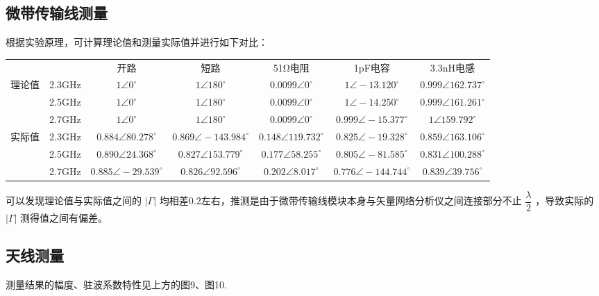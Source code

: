 \documentclass{source/Report}
\begin{document}
\subsection{微带传输线测量}
根据实验原理，可计算理论值和测量实际值并进行如下对比：\par
\begin{table}[h]
    \centering
    \begin{tabular}{|c|c|c|c|c|c|c|}
    \hline
    \multicolumn{2}{|c|}{\multirow{2}{*}{}} &\multirow{2}{*}{开路}&\multirow{2}{*}{短路} & \multirow{2}{*}{51Ω电阻}&\multirow{2}{*}{1pF电容} & \multirow{2}{*}{3.3nH电感}\\
    \multicolumn{2}{|c|}{\multirow{2}{*}{}} & & & & & \\
    \hline
    \multirow{3}{*}{理论值} & 2.3GHz & $1\angle 0^{\circ}$ & $1\angle 180^{\circ}$ & $0.0099\angle 0^{\circ}$ & $1\angle -13.120^{\circ}$ & $0.999\angle 162.737^{\circ}$ \\
    \cline{2-7}
    \multirow{3}{*}{}  & 2.5GHz & $1\angle 0^{\circ}$ & $1\angle 180^{\circ}$ & $0.0099\angle 0^{\circ}$ & $1\angle -14.250^{\circ}$ & $0.999\angle 161.261^{\circ}$ \\
    \cline{2-7}
    \multirow{3}{*}{} & 2.7GHz & $1\angle 0^{\circ}$ & $1\angle 180^{\circ}$ & $0.0099\angle 0^{\circ}$ & $0.999\angle -15.377^{\circ}$ & $1\angle 159.792^{\circ}$ \\
    \hline
    \multirow{3}{*}{实际值} & 2.3GHz & $0.884\angle 80.278^{\circ}$ & $0.869\angle -143.984^{\circ}$ & $0.148\angle 119.732^{\circ}$ & $0.825\angle -19.328^{\circ}$ & $0.859\angle 163.106^{\circ}$ \\
    \cline{2-7}
    \multirow{3}{*}{}  & 2.5GHz & $0.890\angle 24.368^{\circ}$ & $0.827\angle 153.779^{\circ}$ & $0.177\angle 58.255^{\circ}$ & $0.805\angle -81.585^{\circ}$ & $0.831\angle 100.288^{\circ}$ \\
    \cline{2-7}
    \multirow{3}{*}{} & 2.7GHz & $0.885\angle -29.539^{\circ}$ & $0.826\angle 92.596^{\circ}$ & $0.202\angle 8.017^{\circ}$ & $0.776\angle -144.744^{\circ}$ & $0.839\angle 39.756^{\circ}$ \\
    \hline
    \end{tabular}
\end{table}
可以发现理论值与实际值之间的 $|\Gamma|$ 均相差0.2左右，推测是由于微带传输线模块本身与矢量网络分析仪之间连接部分不止 $\displaystyle \dfrac{\lambda}{2}$ ，导致实际的 $|\Gamma|$ 测得值之间有偏差。
\subsection{天线测量}
测量结果的幅度、驻波系数特性见上方的图9、图10.
\end{document}
